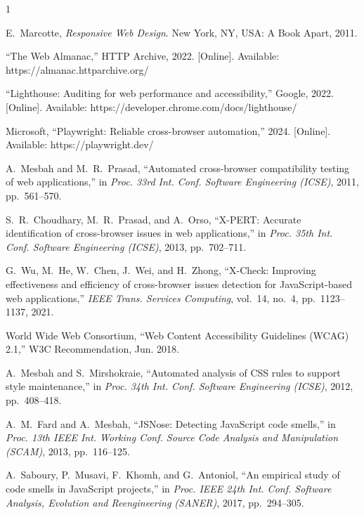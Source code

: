 \documentclass[conference]{IEEEtran}
\begin{document}
\begin{thebibliography}{1}

E.~Marcotte, \emph{Responsive Web Design}. New York, NY, USA: A Book
Apart, 2011.

``The Web Almanac,'' HTTP Archive, 2022. [Online]. Available:
https://almanac.httparchive.org/

``Lighthouse: Auditing for web performance and accessibility,'' Google,
2022. [Online]. Available: https://developer.chrome.com/docs/lighthouse/

Microsoft, ``Playwright: Reliable cross-browser automation,'' 2024.
[Online]. Available: https://playwright.dev/

A.~Mesbah and M.~R.~Prasad, ``Automated cross-browser compatibility
testing of web applications,'' in \emph{Proc. 33rd Int. Conf. Software
Engineering (ICSE)}, 2011, pp.~561--570.

S.~R.~Choudhary, M.~R.~Prasad, and A.~Orso, ``X-PERT: Accurate
identification of cross-browser issues in web applications,'' in
\emph{Proc. 35th Int. Conf. Software Engineering (ICSE)}, 2013,
pp.~702--711.

G.~Wu, M.~He, W.~Chen, J.~Wei, and H.~Zhong, ``X-Check: Improving
effectiveness and efficiency of cross-browser issues detection for
JavaScript-based web applications,'' \emph{IEEE Trans. Services
Computing}, vol.~14, no.~4, pp.~1123--1137, 2021.

World Wide Web Consortium, ``Web Content Accessibility Guidelines
(WCAG) 2.1,'' W3C Recommendation, Jun. 2018.

A.~Mesbah and S.~Mirshokraie, ``Automated analysis of CSS rules to
support style maintenance,'' in \emph{Proc. 34th Int. Conf. Software
Engineering (ICSE)}, 2012, pp.~408--418.

A.~M.~Fard and A.~Mesbah, ``JSNose: Detecting JavaScript code smells,''
in \emph{Proc. 13th IEEE Int. Working Conf. Source Code Analysis and
Manipulation (SCAM)}, 2013, pp.~116--125.

A.~Saboury, P.~Musavi, F.~Khomh, and G.~Antoniol, ``An empirical study
of code smells in JavaScript projects,'' in \emph{Proc. IEEE 24th Int.
Conf. Software Analysis, Evolution and Reengineering (SANER)}, 2017,
pp.~294--305.


\end{thebibliography}
\end{document}
